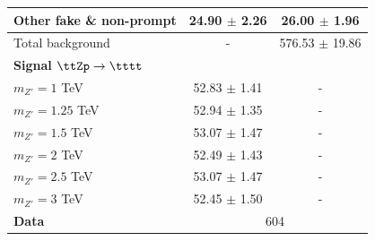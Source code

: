 \documentclass[../thesis.tex]{subfiles}
\begin{document}
\begin{table}[!htb]
{\begin{tabular}{lcc}
      Other fake \& non-prompt 	& 24.90 $\pm$ 2.26		& 26.00 $\pm$ 1.96 \\
      \midrule
      Total background		 	& -	& 576.53 $\pm$ 19.86 \\
      \midrule
      \multicolumn{3}{l}{\textbf{Signal $\ttZp \rightarrow \tttt$}} 	\\	
      $m_{Z'}=1$ TeV 			& 52.83 $\pm$ 1.41		& - \\
      $m_{Z'}=1.25$ TeV 		& 52.94 $\pm$ 1.35		& - \\
      $m_{Z'}=1.5$ TeV 			& 53.07 $\pm$ 1.47		& - \\
      $m_{Z'}=2$ TeV 			& 52.49 $\pm$ 1.43		& - \\ %
      $m_{Z'}=2.5$ TeV 			& 53.07 $\pm$ 1.47		& - \\
      $m_{Z'}=3$ TeV 			& 52.45 $\pm$ 1.50		& - \\
      \midrule
      \textbf{Data}				& \multicolumn{2}{c}{604} 		\\
      \midrule\bottomrule
    \end{tabular}
}
\end{table}
\end{document}
